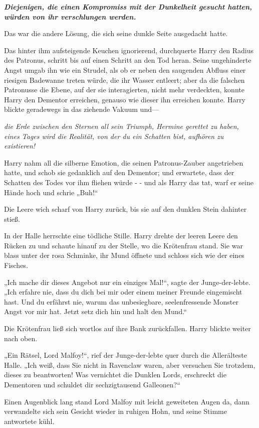 {\textbf{\emph{Diejenigen, die einen Kompromiss mit der Dunkelheit gesucht hatten, würden von ihr verschlungen werden.}}

Das war die andere Lösung, die sich seine dunkle Seite ausgedacht hatte.

Das hinter ihm aufsteigende Keuchen ignorierend, durchquerte Harry den Radius des Patronus, schritt bis auf einen Schritt an den Tod heran. Seine ungehinderte Angst umgab ihn wie ein Strudel, als ob er neben den saugenden Abfluss einer riesigen Badewanne treten würde, die ihr Wasser entleert; aber da die falschen Patronusse die Ebene, auf der sie interagierten, nicht mehr verdeckten, konnte Harry den Dementor erreichen, genauso wie dieser ihn erreichen konnte. Harry blickte geradewegs in das ziehende Vakuum und—

\emph{die Erde zwischen den Sternen all sein Triumph, Hermine gerettet zu haben, eines Tages wird die Realität, von der du ein Schatten bist, aufhören zu existieren!}

Harry nahm all die silberne Emotion, die seinen Patronus-Zauber angetrieben hatte, und schob sie gedanklich auf den Dementor; und erwartete, dass der Schatten des Todes vor ihm fliehen würde - - und als Harry das tat, warf er seine Hände hoch und schrie „Buh!“

Die Leere wich scharf von Harry zurück, bis sie auf den dunklen Stein dahinter stieß.

In der Halle herrschte eine tödliche Stille. Harry drehte der leeren Leere den Rücken zu und schaute hinauf zu der Stelle, wo die Krötenfrau stand. Sie war blass unter der rosa Schminke, ihr Mund öffnete und schloss sich wie der eines Fisches.

„Ich mache dir dieses Angebot nur ein einziges Mal!“, sagte der Junge-der-lebte. „Ich erfahre nie, dass du dich bei mir oder einem meiner Freunde eingemischt hast. Und du erfährst nie, warum das unbesiegbare, seelenfressende Monster Angst vor mir hat. Jetzt setz dich hin und halt den Mund.“

Die Krötenfrau ließ sich wortlos auf ihre Bank zurückfallen. Harry blickte weiter nach oben.

„Ein Rätsel, Lord Malfoy!“, rief der Junge-der-lebte quer durch die Allerälteste Halle. „Ich weiß, dass Sie nicht in Ravenclaw waren, aber versuchen Sie trotzdem, dieses zu beantworten! Was vernichtet die Dunklen Lords, erschreckt die Dementoren und schuldet dir sechzigtausend Galleonen?“

Einen Augenblick lang stand Lord Malfoy mit leicht geweiteten Augen da, dann verwandelte sich sein Gesicht wieder in ruhigen Hohn, und seine Stimme antwortete kühl.

}
